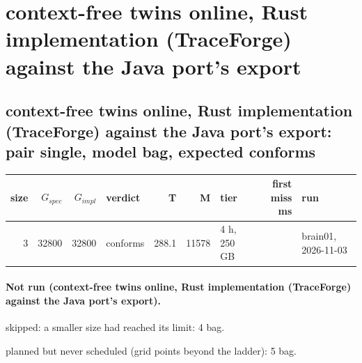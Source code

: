 \documentclass[10pt]{article}
\begin{document}
\section*{context-free twins online, Rust implementation (TraceForge) against the Java port's export}
\subsection*{context-free twins online, Rust implementation (TraceForge) against the Java port's export: pair \textsf{single}, model bag, expected conforms}
\begin{longtable}{@{}rrrlrrlrl@{}}
\toprule
size & $G_{\mathit{spec}}$ & $G_{\mathit{impl}}$ & verdict & T & M & tier & first miss ms & run \\
\midrule
\endhead
\color{red} 3 & 32800 & 32800 & conforms & 288.1 & 11578 & 4 h, 250 GB &  & brain01, 2026-11-03 \\
\bottomrule
\end{longtable}
\paragraph{Not run (context-free twins online, Rust implementation (TraceForge) against the Java port's export).}
skipped: a smaller size had reached its limit: 4 bag.\par
planned but never scheduled (grid points beyond the ladder): 5 bag.\par
\end{document}
